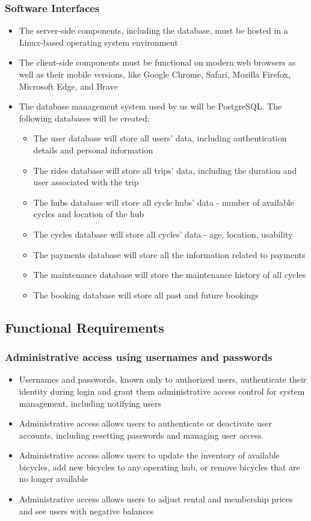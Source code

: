 \documentclass[11pt]{article}
\begin{document}
\subsubsection{Software Interfaces}
\begin{itemize}
    \item The server-side components, including the database, must be hosted in a Linux-based operating system environment
    \item The client-side components must be functional on modern web browsers as well as their mobile versions, like Google Chrome, Safari, Mozilla Firefox, Microsoft Edge, and Brave
    \item The database management system used by us will be PostgreSQL. The following databases will be created:
    \begin{itemize}[label={*}]
        \item The user database will store all users’ data, including authentication details and personal information
        \item The rides database will store all trips’ data, including the duration and user associated with the trip
        \item The hubs database will store all cycle hubs’ data - number of available cycles and location of the hub
        \item The cycles database will store all cycles’ data - age, location, usability
        \item The payments database will store all the information related to payments
        \item The maintenance database will store the maintenance history of all cycles
        \item The booking database will store all past and future bookings
    \end{itemize}
\end{itemize}

\subsection{Functional Requirements}
\subsubsection{Administrative access using usernames and passwords}
\begin{itemize}
    \item Usernames and passwords, known only to authorized users, authenticate their identity during login and grant them administrative access control for system management, including notifying users
    \item Administrative access allows users to authenticate or deactivate user accounts, including resetting passwords and managing user access.
    \item Administrative access allows users to update the inventory of available bicycles, add new bicycles to any operating hub, or remove bicycles that are no longer available
    \item Administrative access allows users to adjust rental and membership prices and see users with negative balances
\end{itemize}
\end{document}
